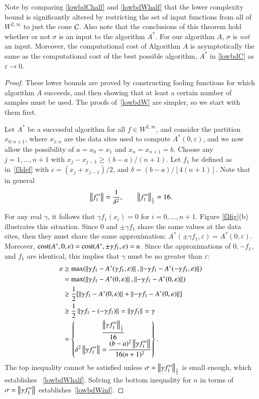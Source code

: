 \documentclass[review]{elsarticle}
\newcommand{\abstol}{\varepsilon}
\theoremstyle{definition}
\renewcommand{\cw}{W}
\begin{document}
Note by comparing \eqref{lowbdChalf} and \eqref{lowbdWhalf} that the lower complexity bound is significantly altered by restricting the
set of input functions from all of $ \cw^{2,\infty}$ to just the cone
$\cc$. Also note that the
conclusions of this theorem hold whether or not $\sigma$ is an input to the
algorithm $A^*$. For our algorithm $A$, $\sigma$ is \emph{not} an input. Moreover, the computational cost of Algorithm $A$ is asymptotically
the same as the computational cost of the best possible algorithm, $A^*$ in \eqref{lowbdC} as $\abstol \to 0$.

\begin{proof}
	These lower bounds are proved by constructing fooling functions for which
	algorithm $A$ succeeds, and then showing that at least a certain number of
	samples must be used. The proofs of~\eqref{lowbdW} are simpler, so
	we start with them first.
		
	Let $A^*$ be a successful algorithm for all $f \in \cw^{2,\infty}$, and consider
	the partition $x_{0:n+1}$, where $x_{1:n}$ are the data sites
	used to compute $A^*(0,\abstol)$, and we now allow the possibility of $a = x_0=x_1$ and $x_n = x_{n+1} = b$. Choose any $j=1, \ldots, n+1$ with
	$x_j-x_{j-1} \ge (b-a)/(n+1)$. Let $f_1$ be defined as in~\eqref{f3def} with $c
	= (x_j+x_{j-1})/2$, and $\delta = (b-a)/[4(n+1)]$. Note that in general
	\begin{equation}
	\norm{f_1''} = \frac{1}{\delta^{2}}, \qquad \norm[\frac 12]{f_1''} = 16.
	\end{equation}

	For any real $\gamma$, it follows that $\gamma f_1(x_i)=0$ for $i=0, \ldots,
	n+1$. Figure \ref{f3fig}(b) illustrates this situation. Since $0$ and $\pm
	\gamma f_1$ share the same values at the data sites, then they must share the
	same approximation: $A^*(\pm \gamma f_1,\abstol) = A^*(0,\abstol)$. Moreover,
	$\cost(A^*,0,\abstol) = \cost(A^*,\pm \gamma f_1,\abstol) = n$. Since the
	approximations of $0, -f_1$, and $f_1$ are identical, this implies that $\gamma$
	must be no greater than $\abstol$:
	\begin{align*}
	\abstol  &\ge \max(\norm{\gamma f_1 - A^*(\gamma f_1,\abstol)}, \norm{-\gamma f_1 - A^*(-\gamma f_1,\abstol)}) \\
	&= \max(\norm{\gamma f_1 - A^*(0,\abstol)}, \norm{-\gamma f_1 - A^*(0,\abstol)}) \\
	& \ge \frac{1}{2} [\norm{\gamma f_1 - A^*(0,\abstol)} + \norm{-\gamma f_1 - A^*(0,\abstol)}] \\
	& \ge \frac{1}{2} \norm{\gamma f_1 - (-\gamma f_1)} =  \norm{\gamma f_1} = \gamma \\
	& = \begin{Bmatrix} \displaystyle \frac{ \norm[\frac 12]{\gamma f_1''}}{16}  \\
	\displaystyle \delta^2 	\norm{\gamma f_1''} =  \frac{(b-a)^2 \norm{\gamma f_1''}}{16(n+1)^2}
	\end{Bmatrix}.
	\end{align*}
	The top inequality cannot be satisfied unless $\sigma = \norm[\frac 12]{\gamma
	f_1''}$ is small enough, which establishes ~\eqref{lowbdWhalf}. Solving the
	bottom inequality for $n$ in terms of $\sigma = \norm{\gamma f_1''}$
	establishes~\eqref{lowbdWinf}.


\end{proof}
\end{document}
